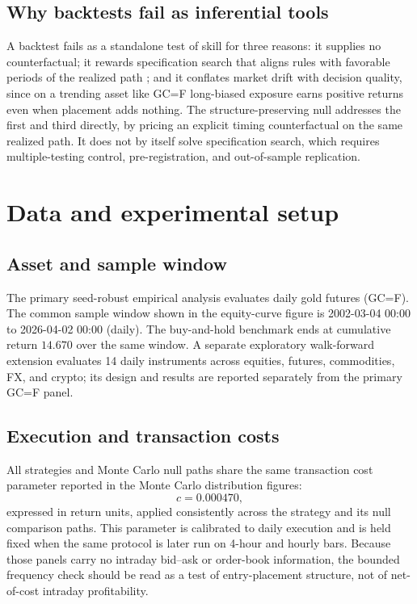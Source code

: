 \documentclass[preprint,12pt]{elsarticle}
\theoremstyle{definition}
\begin{document}
\subsection{Why backtests fail as inferential tools}

A backtest fails as a standalone test of skill for three reasons: it supplies no counterfactual; it rewards specification search that aligns rules with favorable periods of the realized path \cite{bailey2017}; and it conflates market drift with decision quality, since on a trending asset like GC=F long-biased exposure earns positive returns even when placement adds nothing. The structure-preserving null addresses the first and third directly, by pricing an explicit timing counterfactual on the same realized path. It does not by itself solve specification search, which requires multiple-testing control, pre-registration, and out-of-sample replication.

\section{Data and experimental setup}

\subsection{Asset and sample window}

The primary seed-robust empirical analysis evaluates daily gold futures (GC=F). The common sample window shown in the equity-curve figure is 2002-03-04 00:00 to 2026-04-02 00:00 (daily). The buy-and-hold benchmark ends at cumulative return $14.670$ over the same window. A separate exploratory walk-forward extension evaluates 14 daily instruments across equities, futures, commodities, FX, and crypto; its design and results are reported separately from the primary GC=F panel.

\subsection{Execution and transaction costs}

All strategies and Monte Carlo null paths share the same transaction cost parameter reported in the Monte Carlo distribution figures:
\begin{equation}
c = 0.000470,
\end{equation}
expressed in return units, applied consistently across the strategy and its null comparison paths. This parameter is calibrated to daily execution and is held fixed when the same protocol is later run on 4-hour and hourly bars. Because those panels carry no intraday bid--ask or order-book information, the bounded frequency check should be read as a test of entry-placement structure, not of net-of-cost intraday profitability.
\end{document}
